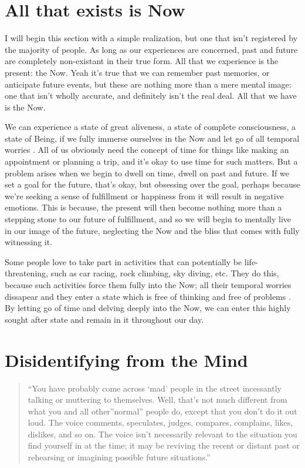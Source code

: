 \documentclass[
]{book}
\begin{document}
\hypertarget{all-that-exists-is-now}{%
\section{All that exists is Now}\label{all-that-exists-is-now}}

I will begin this section with a simple realization, but one that isn't registered by the majority of people. As long as our experiences are concerned, past and future are completely non-existant in their true form. All that we experience is the present: the Now. Yeah it's true that we can remember past memories, or anticipate future events, but these are nothing more than a mere mental image: one that isn't wholly accurate, and definitely isn't the real deal. All that we have is the Now.

We can experience a state of great aliveness, a state of complete consciousness, a state of Being, if we fully immerse ourselves in the Now and let go of all temporal worries \citep{synchronize}. All of us obviously need the concept of time for things like making an appointment or planning a trip, and it's okay to use time for such matters. But a problem arises when we begin to dwell on time, dwell on past and future. If we set a goal for the future, that's okay, but obsessing over the goal, perhaps because we're seeking a sense of fulfillment or happiness from it will result in negative emotions. This is because, the present will then become nothing more than a stepping stone to our future of fulfillment, and so we will begin to mentally live in our image of the future, neglecting the Now and the bliss that comes with fully witnessing it.

Some people love to take part in activities that can potentially be life-threatening, such as car racing, rock climbing, sky diving, etc. They do this, because such activities force them fully into the Now; all their temporal worries dissapear and they enter a state which is free of thinking and free of problems \citep{rockclimbing}. By letting go of time and delving deeply into the Now, we can enter this highly sought after state and remain in it throughout our day.

\hypertarget{disidentifying-from-the-mind}{%
\section{Disidentifying from the Mind}\label{disidentifying-from-the-mind}}

\begin{quote}
``You have probably come across `mad' people in the street incessantly talking or
muttering to themselves. Well, that's not much different from what you and all other''normal'' people do, except that you don't do it out loud. The voice comments,
speculates, judges, compares, complains, likes, dislikes, and so on. The voice isn't
necessarily relevant to the situation you find yourself in at the time; it may be
reviving the recent or distant past or rehearsing or imagining possible future
situations.'' \citep[ ]{quote1}
\end{quote}
\end{document}
